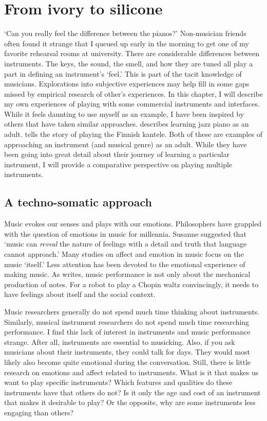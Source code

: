 \chapter{From ivory to silicone}
\label{chapter:conventional}

`Can you really feel the difference between the pianos?' Non-musician friends often found it strange that I queued up early in the morning to get one of my favorite rehearsal rooms at university. There are considerable differences between instruments. The keys, the sound, the smell, and how they are tuned all play a part in defining an instrument's `feel.' This is part of the tacit knowledge of musicians. Explorations into subjective experiences may help fill in some gaps missed by empirical research of other's experiences. In this chapter, I will describe my own experiences of playing with some commercial instruments and interfaces. While it feels daunting to use myself as an example, I have been inspired by others that have taken similar approaches.  \citet{sudnow_ways_1993,sudnow_ways_2001} describes learning jazz piano as an adult. \citet{aho_tangible_2016} tells the story of playing the Finnish kantele. Both of these are examples of approaching an instrument (and musical genre) as an adult. While they have been going into great detail about their journey of learning a particular instrument, I will provide a comparative perspective on playing multiple instruments.


\section{A techno-somatic approach}

Music evokes our senses and plays with our emotions. Philosophers have grappled with the question of emotions in music for millennia. Susanne \citet[p. 235]{langer_philosophy_1957} suggested that `music can \emph{reveal} the nature of feelings with a detail and truth that language cannot approach.' Many studies on affect and emotion in music focus on the music `itself.' Less attention has been devoted to the emotional experience of making music. As \citet{shaffer_cognition_1989} writes, music performance is not only about the mechanical production of notes. For a robot to play a Chopin waltz convincingly, it needs to have feelings about itself and the social context.

Music researchers generally do not spend much time thinking about instruments. Similarly, musical instrument researchers do not spend much time researching performance. I find this lack of interest in instruments and music performance strange. After all, instruments are essential to musicking. Also, if you ask musicians about their instruments, they could talk for days. They would most likely also become quite emotional during the conversation. Still, there is little research on emotions and affect related to instruments. What is it that makes us want to play specific instruments? Which features and qualities do these instruments have that others do not? Is it only the age and cost of an instrument that makes it desirable to play? Or the opposite, why are some instruments less engaging than others?

